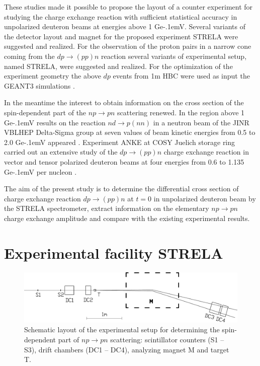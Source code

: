 \documentclass[twocolumn,epjc3]{svjour3}
\newcommand{\np}     {\ensuremath{np \rightarrow pn}\xspace}
\newcommand{\dpchex} {\ensuremath{dp \rightarrow (pp)n}\xspace}
\newcommand{\GeV}    {Ge\kern-.1emV\xspace}
\begin{document}
These studies made it possible to propose the layout of a counter experiment for
studying the charge exchange reaction with sufficient statistical accuracy in
unpolarized deuteron beams at energies above 1 \GeV. Several variants of the
detector layout and magnet for the proposed experiment STRELA were suggested and
realized. For the observation of the proton pairs in a narrow cone coming from
the \dpchex reaction several variants of experimental setup, named STRELA,
were suggested and realized. For the optimization of the experiment geometry the
above $dp$ events from 1m HBC were used as input the GEANT3 simulations
\cite{gla13}.

In the meantime the interest to obtain information on the cross section of the
spin-dependent part of the \np scattering renewed. In the region above 1 \GeV
results on the reaction $nd \rightarrow p(nn)$ in a neutron beam of the JINR
VBLHEP Delta-Sigma group at seven values of beam kinetic energies from 0.5 to
2.0 \GeV appeared \cite{sha09,sha09_2,shi11}. Experiment ANKE at COSY Juelich
storage ring carried out an extensive study of the \dpchex charge exchange
reaction in vector and tensor polarized deuteron beams at four energies from 0.6
to 1.135 \GeV per nucleon \cite{chi09,mch13}.

The aim of the present study is to determine the differential cross section of
charge exchange reaction \dpchex at $t = 0$ in unpolarized deuteron beam by the
STRELA spectrometer, extract information on the elementary \np charge exchange
amplitude and compare with the existing experimental results.

\section{Experimental facility STRELA}

\begin{figure}[t] %
  \centering
  \includegraphics[width=1.00\textwidth]{STRELA_layout.pdf}
  \caption{Schematic layout of the experimental setup for determining the
    spin-dependent part of \np scattering: scintillator counters (S1 -- S3),
    drift chambers (DC1 -- DC4), analyzing magnet M and target T.}
  \label{fig:STRELA_layout}
\end{figure}
\end{document}
